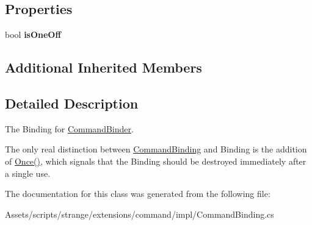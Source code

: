 \subsection*{Properties}
\begin{DoxyCompactItemize}
\item 
\hypertarget{classstrange_1_1extensions_1_1command_1_1impl_1_1_command_binding_a310f0164dcd9324688d1e0000174dcaa}{bool {\bfseries is\-One\-Off}}\label{classstrange_1_1extensions_1_1command_1_1impl_1_1_command_binding_a310f0164dcd9324688d1e0000174dcaa}

\end{DoxyCompactItemize}
\subsection*{Additional Inherited Members}


\subsection{Detailed Description}
The Binding for \hyperlink{classstrange_1_1extensions_1_1command_1_1impl_1_1_command_binder}{Command\-Binder}. 

The only real distinction between \hyperlink{classstrange_1_1extensions_1_1command_1_1impl_1_1_command_binding}{Command\-Binding} and Binding is the addition of {\ttfamily \hyperlink{classstrange_1_1extensions_1_1command_1_1impl_1_1_command_binding_a8e9748be1b68811006095c2b91b226f6}{Once()}}, which signals that the Binding should be destroyed immediately after a single use. 

The documentation for this class was generated from the following file\-:\begin{DoxyCompactItemize}
\item 
Assets/scripts/strange/extensions/command/impl/Command\-Binding.\-cs\end{DoxyCompactItemize}
